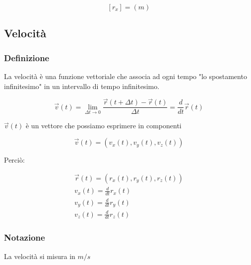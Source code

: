 \documentclass{article}
\begin{document}
$$
[r_x] = (m)
$$

\subsection{Velocità}

\subsubsection{Definizione}

La velocità è una funzione vettoriale che associa ad ogni tempo "lo spostamento infinitesimo" in un intervallo di tempo infinitesimo.

\begin{center}
\end{center}

$$
\vec{v}(t) = \lim_{\Delta t \to 0} \frac{\vec{r}(t + \Delta t) - \vec{r}(t)}{\Delta t} = \frac{d}{dt} \vec{r}(t)
$$

\noindent
$\vec{v}(t)$ è un vettore che possiamo esprimere in componenti

$$
\vec{v}(t) = (v_x(t), v_y(t), v_z(t))
$$

\noindent
Perciò:

$$
\begin{matrix}
\vec{r}(t) = (r_x(t), r_y(t), r_z(t)) \\
v_x(t) = \frac{d}{dt} r_x(t) \\
v_y(t) = \frac{d}{dt} r_y(t) \\
v_z(t) = \frac{d}{dt} r_z(t)
\end{matrix}
$$

\subsubsection{Notazione}

La velocità si misura in $m/s$
\end{document}
